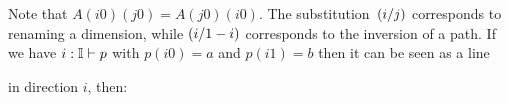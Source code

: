 Note that $A(i0)(j0) = A(j0)(i0)$. The substitution~$(i/j)$
corresponds to renaming a dimension, while $(i/1 - i)$
corresponds to the inversion of a path. If we have $i : \mathbb{I} \vdash p$
with $p(i0) = a$ and $p(i1) = b$ then it can be seen as a line
\begin{center}
\end{center}
in direction $i$, then:
\begin{center}
\end{center}


